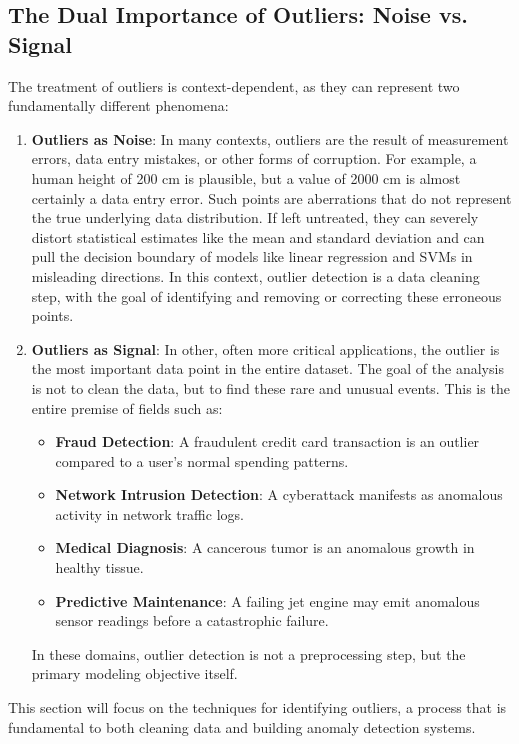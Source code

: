 \begin{itemize}
\subsection{The Dual Importance of Outliers: Noise vs. Signal}
The treatment of outliers is context-dependent, as they can represent two fundamentally different phenomena:
\begin{enumerate}
    \item \textbf{Outliers as Noise}: In many contexts, outliers are the result of measurement errors, data entry mistakes, or other forms of corruption. For example, a human height of 200 cm is plausible, but a value of 2000 cm is almost certainly a data entry error. Such points are aberrations that do not represent the true underlying data distribution. If left untreated, they can severely distort statistical estimates like the mean and standard deviation and can pull the decision boundary of models like linear regression and SVMs in misleading directions. In this context, outlier detection is a data cleaning step, with the goal of identifying and removing or correcting these erroneous points.
    
    \item \textbf{Outliers as Signal}: In other, often more critical applications, the outlier is the most important data point in the entire dataset. The goal of the analysis is not to clean the data, but to find these rare and unusual events. This is the entire premise of fields such as:
    \begin{itemize}
        \item \textbf{Fraud Detection}: A fraudulent credit card transaction is an outlier compared to a user's normal spending patterns.
        \item \textbf{Network Intrusion Detection}: A cyberattack manifests as anomalous activity in network traffic logs.
        \item \textbf{Medical Diagnosis}: A cancerous tumor is an anomalous growth in healthy tissue.
        \item \textbf{Predictive Maintenance}: A failing jet engine may emit anomalous sensor readings before a catastrophic failure.
    \end{itemize}
    In these domains, outlier detection is not a preprocessing step, but the primary modeling objective itself.
\end{enumerate}
This section will focus on the techniques for identifying outliers, a process that is fundamental to both cleaning data and building anomaly detection systems.


\end{itemize}
